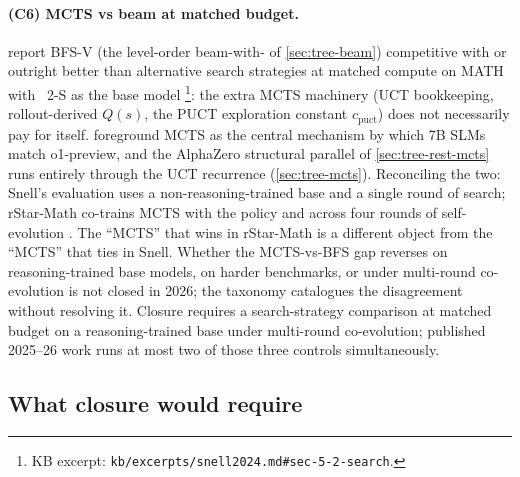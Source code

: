 \paragraph{(C6) MCTS vs beam at matched budget.}
 report BFS-V (the level-order beam-with-
of \cref{sec:tree-beam}) competitive with or outright better than
alternative search strategies at matched compute on MATH with
~2-S\* as the base model
\citep[\S 5.2]{snell2024}\footnote{KB excerpt:
\nolinkurl{kb/excerpts/snell2024.md#sec-5-2-search}.}: the extra MCTS
machinery (UCT bookkeeping, rollout-derived $Q(s)$, the PUCT
exploration constant $c_\text{puct}$) does not necessarily pay for
itself.  foreground MCTS as the central
mechanism by which 7B SLMs match o1-preview, and the AlphaZero
structural parallel of \cref{sec:tree-rest-mcts} runs entirely through
the UCT recurrence (\cref{sec:tree-mcts}). Reconciling the two: Snell's
evaluation uses a non-reasoning-trained base and a single round of
search; rStar-Math co-trains MCTS with the policy and  across four
rounds of self-evolution \citep[abstract]{rstar-math2025}. The
``MCTS'' that wins in rStar-Math is a different object from the
``MCTS'' that ties in Snell. Whether the MCTS-vs-BFS gap reverses on
reasoning-trained base models, on harder benchmarks, or under
multi-round co-evolution is not closed in 2026; the
\citet{wei2025-tree-search-survey} taxonomy catalogues the
disagreement without resolving
it. Closure requires a search-strategy comparison
at matched budget on a reasoning-trained base under multi-round
co-evolution; published 2025--26 work runs at most two of those three
controls simultaneously.

\subsection{What closure would require}
\label{sec:contradictions-closure}

